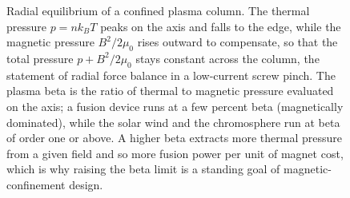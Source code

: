 \begin{figure}[htbp]
\centering
{}
\caption[Radial pressure balance and plasma beta]{Radial equilibrium of a
confined plasma column. The thermal pressure $p = nk_{B}T$ peaks on the
axis and falls to the edge, while the magnetic pressure $B^{2}/2\mu_{0}$
rises outward to compensate, so that the total pressure
$p + B^{2}/2\mu_{0}$ stays constant across the column, the statement of
radial force balance in a low-current screw pinch. The plasma beta is the
ratio of thermal to magnetic pressure evaluated on the axis; a fusion
device runs at a few percent beta (magnetically dominated), while the solar
wind and the chromosphere run at beta of order one or above. A higher beta
extracts more thermal pressure from a given field and so more fusion power
per unit of magnet cost, which is why raising the beta limit is a standing
goal of magnetic-confinement design.}
\label{fig:vol04ch13:pressure-balance}
\end{figure}
